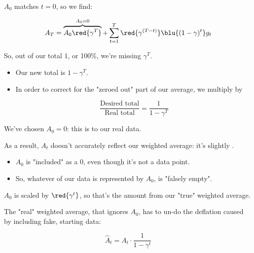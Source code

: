             $A_0$ matches $t=0$, so we find:

            \begin{equation}
                A_T = \overbrace{ A_0 \red{\gamma^T}}^{A_0=0} + 
                \sum_{t=1}^T \red{\gamma^{(T-t)}} \blu{(1-\gamma)^t} g_t
            \end{equation}

            So, out of our total $1$, or 100\%, we're missing $\gamma^T$.

            \begin{itemize}
                \item Our new total is $1-\gamma^T$.

                \item In order to correct for the "zeroed out" part of our average, we multiply by

                \begin{equation}
                    \frac{\text{Desired total}}{\text{Real total}}=\frac{1}{1-\gamma^T}
                \end{equation}
            \end{itemize}

            \begin{concept}
                We've chosen $A_0=0$: this is  to our real data. 
                
                As a result, $A_t$ doesn't accurately reflect our weighted average: it's slightly .

                \begin{itemize}
                    \item $A_0$ is "included" as a 0, even though it's not a  data point.
                    \item So, whatever  of our data is represented by $A_0$, is "falsely empty".
                \end{itemize}

                $A_0$ is scaled by $\red{\gamma^t}$, so that's the amount  from our "true" weighted average.

                The "real" weighted average, that ignores $A_0$, has to un-do the deflation caused by including fake, starting data:

                \begin{equation*}
                    \widehat{A}_t = A_t \cdot \frac{1}{1-\gamma^t}
                \end{equation*}
            \end{concept}

